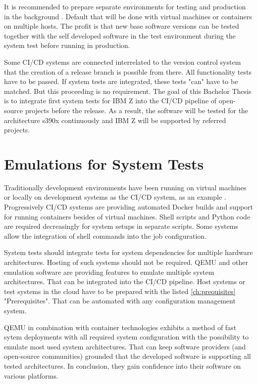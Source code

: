 It is recommended to prepare separate environments for testing and production in the background \cite[~p.120]{Scholl2019}. 
Default that will be done with virtual machines or containers on multiple hosts. The profit is that new base software versions can be tested together with the self developed software in the test environment during the system test before running in production.

Some CI/CD systems are connected interrelated to the version control system that the creation of a release branch is possible from there. All functionality tests have to be passed.  If system tests are integrated, these tests "can" have to be matched. But this proceeding is no requirement. The goal of this Bachelor Thesis is to integrate first system tests for IBM Z into the CI/CD pipeline of open-source projects before the release. As a result, the software will be tested for the architecture s390x continuously and IBM Z will be supported by referred projects.

\section{Emulations for System Tests}

Traditionally development environments have been running on virtual machines or locally on development systems as the CI/CD system, as an example \cite[~p.123]{Scholl2019}. Progressively CI/CD systems are providing automated Docker builds and support for running containers besides of virtual machines. 
Shell scripts and Python code are required decreasingly for system setups in separate scripts. Some systems allow the integration of shell commands into the job configuration.

System tests should integrate tests for system dependencies for multiple hardware architectures. Hosting of such systems should not be required. QEMU and other emulation software are providing features to emulate multiple system architectures.
That can be integrated into the CI/CD pipeline. Host systems or test systems in the cloud have to be prepared with the listed \ref{ch:prequisites} "Prerequisites". That can be automated with any configuration management system.

QEMU in combination with container technologies exhibits a method of fast sytem deployments with all required system configuration with the possibility to emulate most used system architectures. That can keep software providers (and open-source communities) grounded that the developed software is supporting all tested architectures. 
In conclusion, they gain confidence into their software on various platforms.